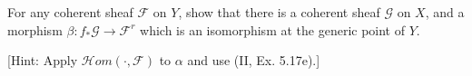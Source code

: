 For any coherent sheaf $\mathcal{F}$ on $Y$, show that there is a coherent sheaf $\mathcal{G}$ on $X$, and a morphism $\beta: f_*\mathcal{G} \rightarrow \mathcal{F}^r$ which is an isomorphism at the generic point of $Y$.

[Hint: Apply $\mathcal{H}\mathit{om}(\cdot, \mathcal{F})$ to $\alpha$ and use (II, Ex. 5.17e).]
